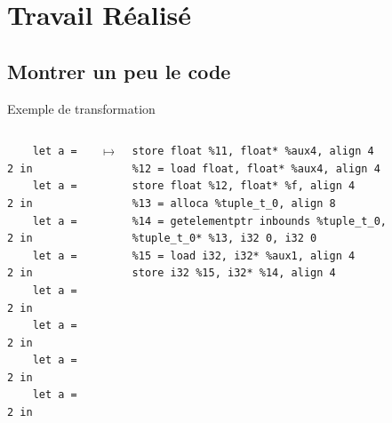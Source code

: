 \documentclass{beamer} %
\begin{document}
\section{Travail Réalisé}

\begin{frame}
    \tableofcontents[currentsection]
\end{frame}

\subsection{Montrer un peu le code}

\begin{frame}[fragile]{Exemple de transformation}
    \begin{columns}
    \begin{column}{0.25\textwidth}
  \begin{verbatim}
    let a = 2 in
    let a = 2 in
    let a = 2 in
    let a = 2 in
    let a = 2 in
    let a = 2 in
    let a = 2 in
    let a = 2 in
   \end{verbatim}
    \end{column}
    \begin{column}{0.05\textwidth}
        $\mapsto$
    \end{column}
    \begin{column}{0.70\textwidth}  %
  \begin{verbatim}
store float %11, float* %aux4, align 4
%12 = load float, float* %aux4, align 4
store float %12, float* %f, align 4
%13 = alloca %tuple_t_0, align 8
%14 = getelementptr inbounds %tuple_t_0, %tuple_t_0* %13, i32 0, i32 0
%15 = load i32, i32* %aux1, align 4
store i32 %15, i32* %14, align 4
   \end{verbatim}
    \end{column}
    \end{columns}
\end{frame}

\end{document}

